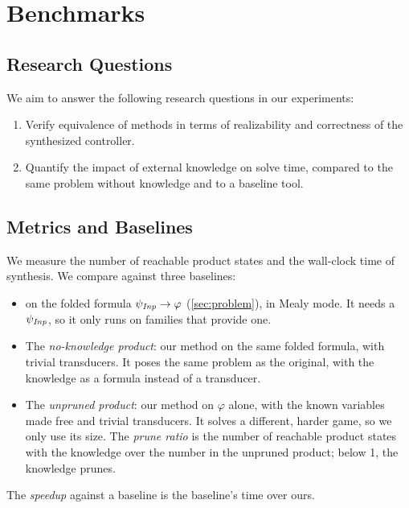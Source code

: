 \section{Benchmarks}\label{sec:benchmarks}

\subsection{Research Questions}
We aim to answer the following research questions in our experiments:

\begin{enumerate}
  \item[RQ1] Verify equivalence of methods in terms of realizability and correctness of the synthesized controller.
  \item[RQ2] Quantify the impact of external knowledge on solve time, compared to the same problem without knowledge and to a baseline tool.
\end{enumerate}

\subsection{Metrics and Baselines}

We measure the number of reachable product states and the wall-clock time of synthesis.
We compare against three baselines:
\begin{itemize}
  \item {} on the folded formula $\psi_{\mathit{Inp}} \rightarrow \varphi$ (\cref{sec:problem}), in Mealy mode. It needs a $\psi_{\mathit{Inp}}$, so it only runs on families that provide one.
  \item The \emph{no-knowledge product}: our method on the same folded formula, with trivial transducers. It poses the same problem as the original, with the knowledge as a formula instead of a transducer.
  \item The \emph{unpruned product}: our method on $\varphi$ alone, with the known variables made free and trivial transducers. It solves a different, harder game, so we only use its size. The \emph{prune ratio} is the number of reachable product states with the knowledge over the number in the unpruned product; below 1, the knowledge prunes.
\end{itemize}
The \emph{speedup} against a baseline is the baseline's time over ours.

